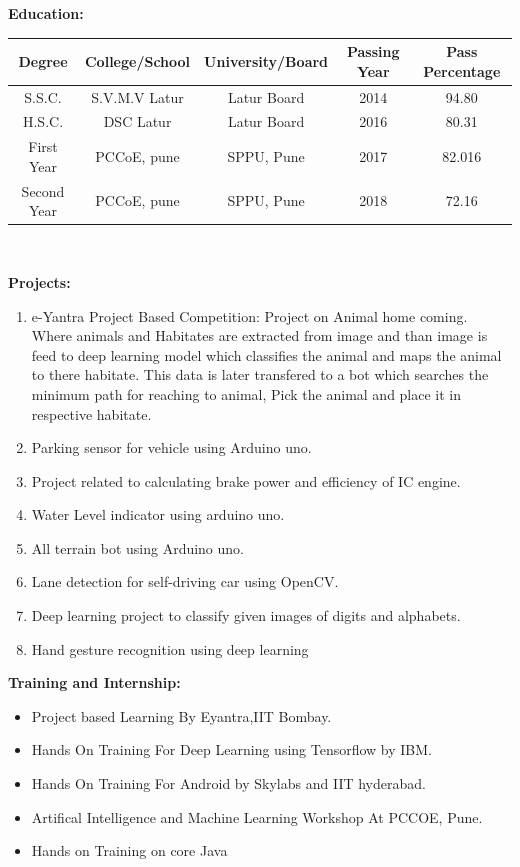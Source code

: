 \documentclass[10pt,twoside,a4paper]{article}
\begin{document}
\noindent
\textbf{Education:}
\begin{center}
\begin{tabular}{|c|c|c|c|c|}
\hline
Degree & College/School & University/Board & Passing Year & Pass Percentage \\
\hline
S.S.C. & S.V.M.V Latur & Latur Board & 2014 & 94.80 \\
\hline
H.S.C. & DSC Latur & Latur Board & 2016 & 80.31 \\
\hline
First Year & PCCoE, pune & SPPU, Pune & 2017 & 82.016 \\
\hline
Second Year & PCCoE, pune & SPPU, Pune & 2018 & 72.16 \\
\hline
\end{tabular}
\\
\end{center}


\noindent
\textbf{Projects:} 
\begin{enumerate}
\item e-Yantra Project Based Competition: Project on Animal home coming. Where animals and Habitates are extracted from image and than image is feed to deep learning model which classifies the animal and maps the animal to there habitate. This data is later transfered to a bot which searches the minimum path for reaching to animal, Pick the animal and place it in respective habitate.
\item Parking sensor for vehicle using Arduino uno.
\item Project related to calculating brake power and efficiency of IC engine.
\item Water Level indicator using arduino uno.
\item All terrain bot using Arduino uno.
\item Lane detection for self-driving car using OpenCV.
\item  Deep learning project to classify given images of digits and alphabets.
\item Hand gesture recognition using deep learning
\\
\end{enumerate}

\noindent
\textbf{Training and Internship:}
\begin{itemize}
\item Project based Learning By Eyantra,IIT Bombay.
\item Hands On Training For Deep Learning using Tensorflow by IBM.
\item Hands On Training For Android by Skylabs and IIT hyderabad.
\item Artifical Intelligence and Machine Learning Workshop At PCCOE, Pune. 
\item Hands on Training on core Java  
\end{itemize}
\end{document}
